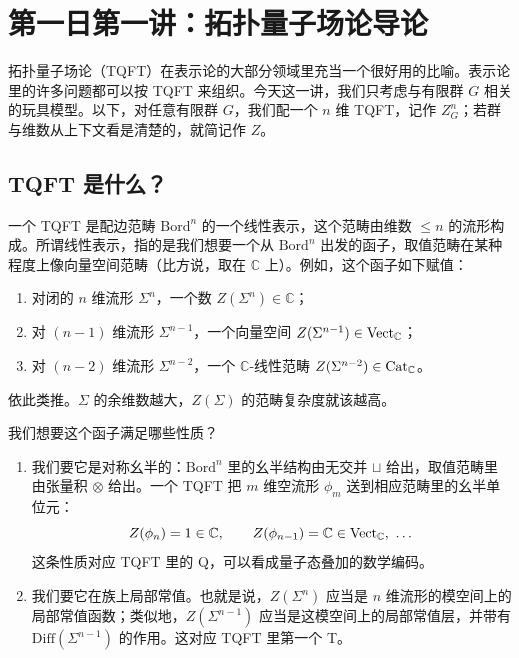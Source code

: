 \section{第一日第一讲：拓扑量子场论导论}

拓扑量子场论（TQFT）在表示论的大部分领域里充当一个很好用的比喻。表示论里的许多问题都可以按 TQFT 来组织。今天这一讲，我们只考虑与有限群 $G$ 相关的玩具模型。以下，对任意有限群 $G$，我们配一个 $n$ 维 TQFT，记作 $Z^n_G$；若群与维数从上下文看是清楚的，就简记作 $Z$。

\subsection{TQFT 是什么？}

一个 TQFT 是配边范畴 $\mathrm{Bord}^n$ 的一个线性表示，这个范畴由维数 $\le n$ 的流形构成。所谓线性表示，指的是我们想要一个从 $\mathrm{Bord}^n$ 出发的函子，取值范畴在某种程度上像向量空间范畴（比方说，取在 $\mathbb C$ 上）。例如，这个函子如下赋值：

\begin{enumerate}[label=(\roman*),leftmargin=2.2em]
\item 对闭的 $n$ 维流形 $\Sigma^n$，一个数 $Z(\Sigma^n)\in\mathbb C$；
\item 对 $(n-1)$ 维流形 $\Sigma^{n-1}$，一个向量空间 $Z(\Sigma^{n-1})\in\operatorname{Vect}_{\mathbb C}$；
\item 对 $(n-2)$ 维流形 $\Sigma^{n-2}$，一个 $\mathbb C$-线性范畴 $Z(\Sigma^{n-2})\in\operatorname{Cat}_{\mathbb C}$。
\end{enumerate}

依此类推。$\Sigma$ 的余维数越大，$Z(\Sigma)$ 的范畴复杂度就该越高。

我们想要这个函子满足哪些性质？

\begin{enumerate}[label=(\roman*),leftmargin=2.2em]
\item 我们要它是对称幺半的：$\mathrm{Bord}^n$ 里的幺半结构由无交并 $\sqcup$ 给出，取值范畴里由张量积 $\otimes$ 给出。一个 TQFT 把 $m$ 维空流形 $\phi_m$ 送到相应范畴里的幺半单位元：
\[
Z(\phi_n)=1\in\mathbb C,\qquad Z(\phi_{n-1})=\mathbb C\in\operatorname{Vect}_{\mathbb C},\ \dots
\]
这条性质对应 TQFT 里的 Q，可以看成量子态叠加的数学编码。
\item 我们要它在族上局部常值。也就是说，$Z(\Sigma^n)$ 应当是 $n$ 维流形的模空间上的局部常值函数；类似地，$Z(\Sigma^{n-1})$ 应当是这模空间上的局部常值层，并带有 $\mathrm{Diff}(\Sigma^{n-1})$ 的作用。这对应 TQFT 里第一个 T。
\end{enumerate}

